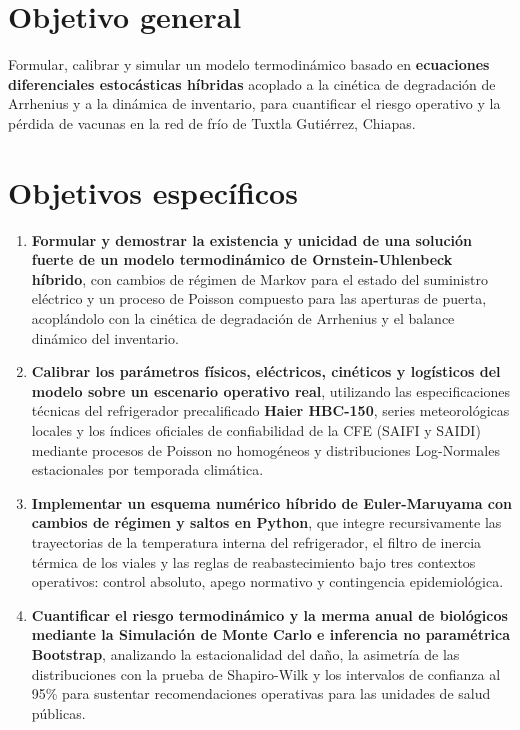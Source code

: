 \documentclass[
  spanish,
  us-letterpaper,
]{scrreprt}
\numberwithin{equation}{section}
\theoremstyle{plain}
\theoremstyle{plain}
\theoremstyle{plain}
\theoremstyle{definition}
\theoremstyle{remark}
\begin{document}
\section{Objetivo general}\label{objetivo-general}

Formular, calibrar y simular un modelo termodinámico basado en
\textbf{ecuaciones diferenciales estocásticas híbridas} acoplado a la
cinética de degradación de Arrhenius y a la dinámica de inventario, para
cuantificar el riesgo operativo y la pérdida de vacunas en la red de
frío de Tuxtla Gutiérrez, Chiapas.

\section{Objetivos específicos}\label{objetivos-especuxedficos}

\begin{enumerate}
\def\labelenumi{\arabic{enumi}.}
\item
  \textbf{Formular y demostrar la existencia y unicidad de una solución
  fuerte de un modelo termodinámico de Ornstein-Uhlenbeck híbrido}, con
  cambios de régimen de Markov para el estado del suministro eléctrico y
  un proceso de Poisson compuesto para las aperturas de puerta,
  acoplándolo con la cinética de degradación de Arrhenius y el balance
  dinámico del inventario.
\item
  \textbf{Calibrar los parámetros físicos, eléctricos, cinéticos y
  logísticos del modelo sobre un escenario operativo real}, utilizando
  las especificaciones técnicas del refrigerador precalificado
  \textbf{Haier HBC-150}, series meteorológicas locales y los índices
  oficiales de confiabilidad de la CFE (SAIFI y SAIDI) mediante procesos
  de Poisson no homogéneos y distribuciones Log-Normales estacionales
  por temporada climática.
\item
  \textbf{Implementar un esquema numérico híbrido de Euler-Maruyama con
  cambios de régimen y saltos en Python}, que integre recursivamente las
  trayectorias de la temperatura interna del refrigerador, el filtro de
  inercia térmica de los viales y las reglas de reabastecimiento bajo
  tres contextos operativos: control absoluto, apego normativo y
  contingencia epidemiológica.
\item
  \textbf{Cuantificar el riesgo termodinámico y la merma anual de
  biológicos mediante la Simulación de Monte Carlo e inferencia no
  paramétrica Bootstrap}, analizando la estacionalidad del daño, la
  asimetría de las distribuciones con la prueba de Shapiro-Wilk y los
  intervalos de confianza al 95\% para sustentar recomendaciones
  operativas para las unidades de salud públicas.
\end{enumerate}
\end{document}
